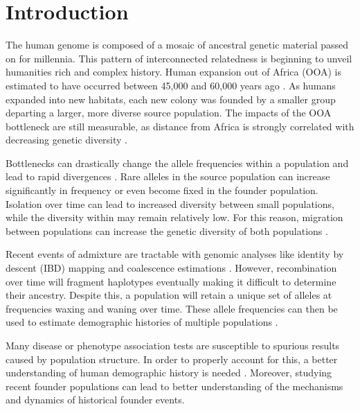 \documentclass[
11pt, %
oneside, %
english, %
doublespacing, %
headsepline, %
chapterinoneline, %
]{MastersDoctoralThesis} %
\begin{document}

\mainmatter %
\pagestyle{thesis} %

\section{Introduction}
The human genome is composed of a mosaic of ancestral genetic material passed on for millennia.
This pattern of interconnected relatedness is beginning to unveil humanities rich and complex history.
Human expansion out of Africa (OOA) is estimated to have occurred between 45,000 and 60,000 years ago \citep{Henn2012}. 
As humans expanded into new habitats, each new colony was founded by a smaller group departing a larger, more diverse source population.
The impacts of the OOA bottleneck are still measurable, as distance from Africa is strongly correlated with decreasing genetic diversity \citep{Ramachandran2005}.

Bottlenecks can drastically change the allele frequencies within a population and lead to rapid divergences \citep{Rosenberg2002, Charlesworth2003}.
Rare alleles in the source population can increase significantly in frequency or even become fixed in the founder population.
Isolation over time can lead to increased diversity between small populations, while the diversity within may remain relatively low. 
For this reason, migration between populations can increase the genetic diversity of both populations \citep{Charlesworth2003}.

Recent events of admixture are tractable with genomic analyses like identity by descent (IBD) mapping and coalescence estimations \citep{Baharian2016}.
However, recombination over time will fragment haplotypes eventually making it difficult to determine their ancestry.
Despite this, a population will retain a unique set of alleles at frequencies waxing and waning over time.
These allele frequencies can then be used to estimate demographic histories of multiple populations \citep{Gravel2011}. 

Many disease or phenotype association tests are susceptible to spurious results caused by population structure.
In order to properly account for this, a better understanding of human demographic history is needed \citep{Gravel2011}.
Moreover, studying recent founder populations can lead to better understanding of the mechanisms and dynamics of historical founder events. 
\end{document}
